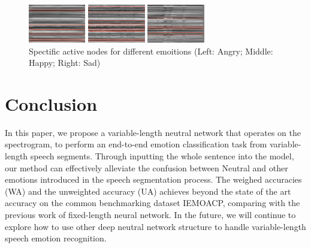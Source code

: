 \documentclass[a4paper]{article}
\begin{document}
\begin{figure}[htb]
    \begin{minipage}[b]{0.25\linewidth}
      \centering
      \centerline{\includegraphics[width=2.5cm]{rnn_out_var_ang}}
    \end{minipage}
    \hfill
    \begin{minipage}[b]{0.25\linewidth}
      \centering
      \centerline{\includegraphics[width=2.5cm]{rnn_out_var_hap}}
    \end{minipage}
    \hfill
    \begin{minipage}[b]{0.25\linewidth}
      \centering
      \centerline{\includegraphics[width=2.5cm]{rnn_out_var_sad}}
    \end{minipage}
    \caption{Spectific active nodes for different emoitions (Left: Angry; Middle: Happy; Right: Sad)}
    \label{fig:rnn_emo}
\end{figure}

    
\section{Conclusion}
\label{sec:conclusion}

In this paper, we propose a variable-length neutral network that operates on the spectrogram, to perform an end-to-end emotion classification task from variable-length speech segments. Through inputting the whole sentence into the model, our method can effectively alleviate the confusion between Neutral and other emotions introduced in the speech segmentation process. The weighed accuracies (WA) and the unweighted accuracy (UA) achieves beyond the state of the art accuracy on the common benchmarking dataset IEMOACP, comparing with the previous work of fixed-length neural network. In the future, we will continue to explore how to use other deep neutral network structure to handle variable-length speech emotion recognition.
\end{document}

